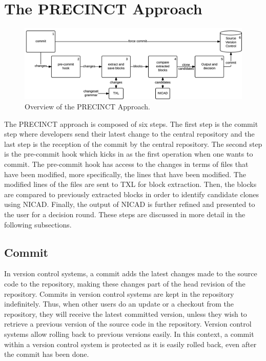 \documentclass[conference]{IEEEtran}
\begin{document}
\cite{Lague}


\section{The PRECINCT Approach}
\label{sec:The PRECINCT Approach}

\begin{figure}
  \centering
    \includegraphics[width=\textwidth]{media/approach.png}
    \caption{ Overview of the PRECINCT Approach.\label{fig:precinct-approach}}
\end{figure}

The PRECINCT approach is composed of six steps. The first step is the commit step where developers send their latest change to the central repository and the last step is the reception of the commit by the central repository. The second step is the pre-commit hook which kicks in as the first operation when one wants to commit. The pre-commit hook has access to the changes in terms of files that have been modified, more specifically, the lines that have been modified. The modified lines of the files are sent to TXL\cite{Cordy2006a} for block extraction. Then, the blocks are compared to previously extracted blocks in order to identify candidate clones  using NICAD\cite{Cordy2011}. Finally, the output of NICAD is further refined and presented to the user for a decision round. These steps are discussed in more detail in the following subsections.

\subsection{Commit}
\label{sub:Commit}

In version control systems, a commit adds the latest changes made to the source code to the repository, making these changes part of the head revision of the repository. Commits in version control systems are kept in the repository indefinitely. Thus, when other users do an update or a checkout from the repository, they will receive the latest committed version, unless they wish to retrieve a previous version of the source code in the repository. Version control systems allow rolling back to previous versions easily. In this context, a commit within a version control system is protected as it is easily rolled back, even after the commit has been done.
\end{document}
